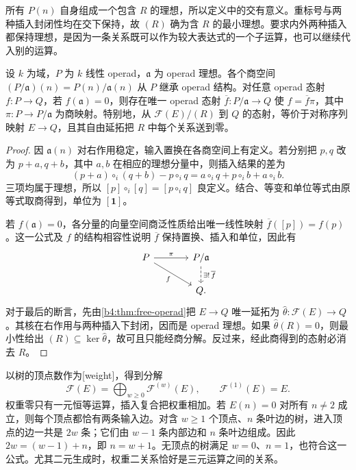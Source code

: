 所有 \(P(n)\) 自身组成一个包含 \(R\) 的理想，所以定义中的交有意义。重标号与两种插入封闭性均在交下保持，故 \((R)\) 确为含 \(R\) 的最小理想。要求内外两种插入都保持理想，是因为一条关系既可以作为较大表达式的一个子运算，也可以继续代入别的运算。

\begin{proposition}\label{b4:prop:operad-quotient}
	设 \(k\) 为域，\(P\) 为 \(k\) 线性 operad，\(\mathfrak a\) 为 operad 理想。各个商空间 \((P/\mathfrak a)(n)=P(n)/\mathfrak a(n)\) 从 \(P\) 继承 operad 结构。对任意 operad 态射 \(f:P\rightarrow Q\)，若 \(f(\mathfrak a)=0\)，则存在唯一 operad 态射 \(\overline f:P/\mathfrak a\rightarrow Q\) 使 \(f=\overline f\pi\)，其中 \(\pi:P\rightarrow P/\mathfrak a\) 为商映射。特别地，从 \(\mathcal F(E)/(R)\) 到 \(Q\) 的态射，等价于对称序列映射 \(E\rightarrow Q\)，且其自由延拓把 \(R\) 中每个关系送到零。
\end{proposition}
\begin{proof}
	因 \(\mathfrak a(n)\) 对右作用稳定，输入置换在各商空间上有定义。若分别把 \(p,q\) 改为 \(p+a,q+b\)，其中 \(a,b\) 在相应的理想分量中，则插入结果的差为
	\[
		(p+a)\circ_i(q+b)-p\circ_iq
		=a\circ_iq+p\circ_ib+a\circ_ib.
	\]
	三项均属于理想，所以 \([p]\circ_i[q]=[p\circ_iq]\) 良定义。结合、等变和单位等式由原等式取商得到，单位为 \([\mathbf1]\)。

	若 \(f(\mathfrak a)=0\)，各分量的向量空间商泛性质给出唯一线性映射 \(\overline f([p])=f(p)\)。这一公式及 \(f\) 的结构相容性说明 \(\overline f\) 保持置换、插入和单位，因此有
	\[
		\begin{tikzcd}[column sep=large]
			P\arrow[r,"\pi"]\arrow[dr,"f"']&P/\mathfrak a\arrow[d,dashed,"\exists!\,\overline f"]\\
			&Q.
		\end{tikzcd}
	\]
	对于最后的断言，先由\cref{b4:thm:free-operad}把 \(E\rightarrow Q\) 唯一延拓为 \(\widehat\theta:\mathcal F(E)\rightarrow Q\)。其核在右作用与两种插入下封闭，因而是 operad 理想。如果 \(\widehat\theta(R)=0\)，则最小性给出 \((R)\subseteq\ker\widehat\theta\)，故可且只能经商分解。反过来，经此商得到的态射必消去 \(R\)。
\end{proof}

以树的顶点数作为[weight]，得到分解
\[
	\mathcal F(E)=\bigoplus_{w\geq0}\mathcal F^{(w)}(E),
	\qquad \mathcal F^{(1)}(E)=E.
\]
权重零只有一元恒等运算，插入复合把权重相加。若 \(E(n)=0\) 对所有 \(n\ne2\) 成立，则每个顶点都恰有两条输入边。对含 \(w\geq1\) 个顶点、\(n\) 条叶边的树，进入顶点的边一共是 \(2w\) 条；它们由 \(w-1\) 条内部边和 \(n\) 条叶边组成。因此 \(2w=(w-1)+n\)，即 \(n=w+1\)。无顶点的树满足 \(w=0\)、\(n=1\)，也符合这一公式。尤其二元生成时，权重二关系恰好是三元运算之间的关系。

